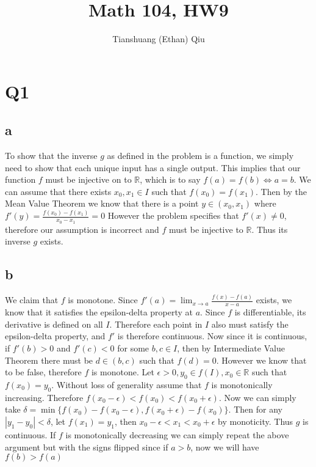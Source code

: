 \documentclass[12pt]{article}
\author{Tianshuang (Ethan) Qiu}
\newcommand{\R}{\mathbb{R}}
\begin{document}
\title{Math 104, HW9}
\maketitle
\newpage

\section{Q1}
\subsection{a}
To show that the inverse $g$ as defined in the problem is a function, we simply need to show that each unique input has a single output. This implies that our function $f$ must be injective on to $\R$, which is to say $f(a) = f(b) \iff a = b$.
\newline
We can assume that there exists $x_0, x_1 \in I$ such that $f(x_0) = f(x_1)$.
Then by the Mean Value Theorem we know that there is a point $y \in (x_0, x_1)$ where $f'(y) = \frac{f(x_0)-f(x_1)}{x_0-x_1}=0$
However the problem specifies that $f'(x) \not= 0$, therefore our assumption is incorrect and $f$ must be injective to $\R$. Thus its inverse $g$ exists.

\subsection{b}
We claim that $f$ is monotone. Since $f'(a) = \lim_{x \to a}\frac{f(x)-f(a)}{x-a}$ exists, we know that it satisfies the epsilon-delta property at $a$. Since $f$ is differentiable, its derivative is defined on all $I$. Therefore each point in $I$ also must satisfy the epsilon-delta property, and $f'$ is therefore continuous. Now since it is continuous, if $f'(b)>0$ and $f'(c)<0$ for some $b,c \in I$, then by Intermediate Value Theorem there must be $d \in (b,c)$ such that $f(d)=0$. However we know that to be false, therefore $f$ is monotone.
\newline
Let $\epsilon > 0, y_0 \in f(I), x_0 \in \R$ such that $f(x_0)=y_0$. Without loss of generality assume that $f$ is monotonically increasing. Therefore $f(x_0-\epsilon) < f(x_0) < f(x_0+\epsilon)$.
Now we can simply take $\delta = \min\{f(x_0)-f(x_0-\epsilon), f(x_0+\epsilon) - f(x_0)\}$. Then for any $|y_1-y_0|<\delta$, let $f(x_1)=y_1$, then $x_0-\epsilon < x_1 < x_0 + \epsilon$ by monoticity. Thus $g$ is continuous.
\newline
If $f$ is monotonically decreasing we can simply repeat the above argument but with the signs flipped since if $a > b$, now we will have $f(b) > f(a)$
\newpage
\end{document}

